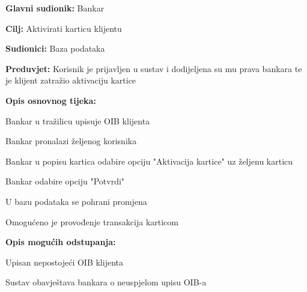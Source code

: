             
            	\noindent {}
            	\begin{packed_item}
            		
            		\item \textbf{Glavni sudionik: }Bankar
            		\item  \textbf{Cilj:} Aktivirati karticu klijentu
            		\item  \textbf{Sudionici:} Baza podataka
            		\item  \textbf{Preduvjet:} Korisnik je prijavljen u sustav i dodijeljena su mu prava bankara te je klijent zatražio aktivaciju kartice
            		\item  \textbf{Opis osnovnog tijeka:}
            		
            		\item[] \begin{packed_enum}
            			
            			\item Bankar u tražilicu upisuje OIB klijenta
            			\item Bankar pronalazi željenog korisnika
            			\item Bankar u popisu kartica odabire opciju "Aktivacija kartice" uz željenu karticu
            			\item Bankar odabire opciju "Potvrdi"
            			\item U bazu podataka se pohrani promjena 
            			\item Omogućeno je provođenje transakcija karticom
            		\end{packed_enum}
            		
            		\item  \textbf{Opis mogućih odstupanja:} 
            		
            		\item[] \begin{packed_item}
            			
            			\item[1.a] Upisan nepostojeći OIB klijenta
            			\item[] \begin{packed_enum}
            				
            				\item Sustav obavještava bankara o neuspjelom upisu OIB-a
            				
            			\end{packed_enum}
            			
            		\end{packed_item}
            	\end{packed_item}
                
